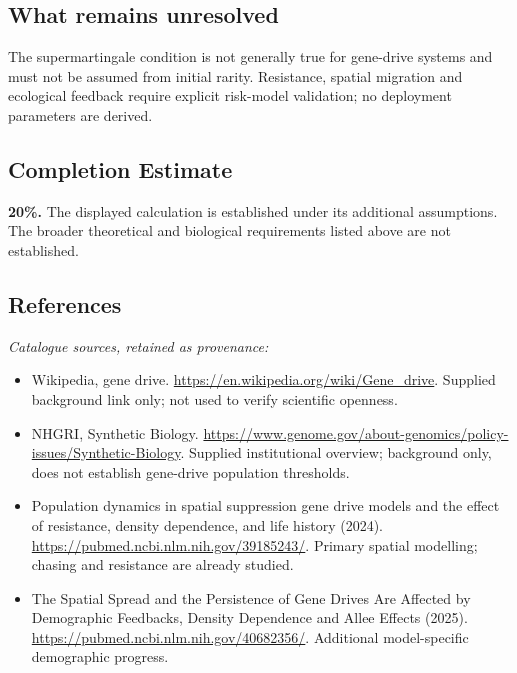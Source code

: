 \documentclass[11pt]{article}
\begin{document}
\subsection{What remains unresolved}
The supermartingale condition is not generally true for gene-drive systems and must not be assumed from initial rarity. Resistance, spatial migration and ecological feedback require explicit risk-model validation; no deployment parameters are derived.
\subsection{Completion Estimate}
\textbf{20\%.} The displayed calculation is established under its additional assumptions. The broader theoretical and biological requirements listed above are not established.
\subsection{References}
\noindent\emph{Catalogue sources, retained as provenance:}
\begin{itemize}
\item Wikipedia, gene drive. \url{https://en.wikipedia.org/wiki/Gene_drive}. Supplied background link only; not used to verify scientific openness.
\item NHGRI, Synthetic Biology. \url{https://www.genome.gov/about-genomics/policy-issues/Synthetic-Biology}. Supplied institutional overview; background only, does not establish gene-drive population thresholds.
\item Population dynamics in spatial suppression gene drive models and the effect of resistance, density dependence, and life history (2024). \url{https://pubmed.ncbi.nlm.nih.gov/39185243/}. Primary spatial modelling; chasing and resistance are already studied.
\item The Spatial Spread and the Persistence of Gene Drives Are Affected by Demographic Feedbacks, Density Dependence and Allee Effects (2025). \url{https://pubmed.ncbi.nlm.nih.gov/40682356/}. Additional model-specific demographic progress.
\end{itemize}
\end{document}
